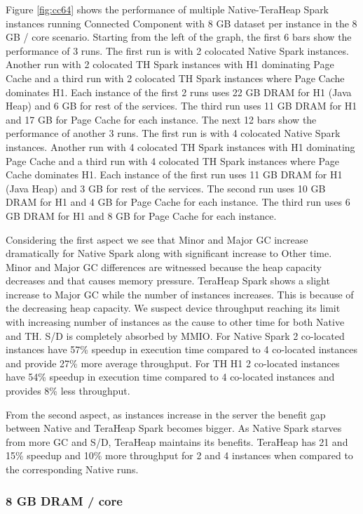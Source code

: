 Figure \ref{fig:cc64} shows the performance of multiple
Native-TeraHeap Spark instances running Connected Component with 8 GB
dataset per instance in the 8 GB / core scenario.
Starting from the left of the graph, the first 6 bars show the
performance of 3 runs. The first run is with 2 colocated Native Spark instances.
Another run with 2 colocated TH Spark instances with H1 dominating Page Cache
and a third run with 2 colocated TH Spark instances where Page Cache dominates H1.
Each instance of the first 2 runs uses 22 GB DRAM for H1 (Java Heap) and 6 GB for rest of the services.
The third run uses 11 GB DRAM for H1 and 17 GB for Page Cache for each instance. 
The next 12 bars show the performance of another 3 runs. The first run is with 4 colocated Native Spark instances.
Another run with 4 colocated TH Spark instances with H1 dominating Page Cache
and a third run with 4 colocated TH Spark instances where Page Cache dominates H1.
Each instance of the first run uses 11 GB DRAM for H1 (Java Heap) and 3 GB for rest of the services.
The second run uses 10 GB DRAM for H1 and 4 GB for Page Cache for each instance.
The third run uses 6 GB DRAM for H1 and 8 GB for Page Cache for each instance.

Considering the first aspect we see that Minor and Major GC increase dramatically for Native Spark along with significant increase to Other time. Minor and Major GC differences are witnessed because the heap capacity decreases and that causes memory pressure. TeraHeap Spark shows a slight increase to Major GC while the number of instances increases. This is because of the decreasing heap capacity. We suspect device throughput reaching its limit with increasing number of instances as the cause to other time for both Native and TH. S/D is completely absorbed by MMIO. For Native Spark 2 co-located instances have 57\% speedup in execution time compared to 4 co-located instances and provide 27\% more average throughput. For TH H1 2 co-located instances have 54\% speedup in execution time compared to 4 co-located instances and provides 8\% less throughput.

From the second aspect, as instances increase in the server the benefit gap between Native and TeraHeap Spark becomes bigger. As Native Spark starves from more GC and S/D, TeraHeap maintains its benefits. TeraHeap has 21 and 15\% speedup and 10\% more throughput for 2 and 4 instances when compared to the corresponding Native runs.

\subsubsection{8 GB DRAM / core}

